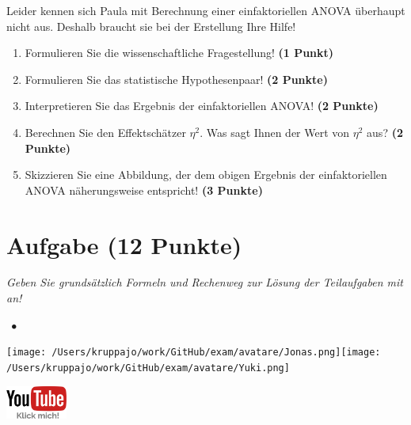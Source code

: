 \documentclass[a4paper, 9pt]{scrartcl}\usepackage[]{graphicx}\usepackage[]{xcolor}
\begin{document}
\vspace{1ex}

Leider kennen sich Paula mit Berechnung einer einfaktoriellen ANOVA überhaupt nicht aus. Deshalb braucht sie bei der Erstellung Ihre Hilfe! 

\begin{enumerate}
  \item Formulieren Sie die wissenschaftliche Fragestellung! \textbf{(1 Punkt)}
  \item Formulieren Sie das statistische Hypothesenpaar! \textbf{(2 Punkte)}
\item Interpretieren Sie das Ergebnis der einfaktoriellen ANOVA! \textbf{(2 Punkte)} 
\item Berechnen Sie den Effektschätzer $\eta^2$. Was sagt Ihnen der Wert von $\eta^2$ aus? \textbf{(2 Punkte)}
\item Skizzieren Sie eine Abbildung, der dem obigen Ergebnis der
  einfaktoriellen ANOVA näherungsweise entspricht! \textbf{(3 Punkte)}
\end{enumerate}

 
\clearpage

\section{Aufgabe \hfill (12 Punkte)}

\textit{Geben Sie grundsätzlich Formeln und Rechenweg zur Lösung der Teilaufgaben mit an!} \\[1Ex]
 

 
\ifcollection
\begin{flushright}
\tiny\vspace{-3Ex}
\textbf{\examinhaltstart}
\exammodulestatversuch $\;\bullet$
\exammodulebiostat
\vspace{-4Ex}
\end{flushright}
\begin{minipage}[t]{0.5\textwidth}
\texttt{[image: /Users/kruppajo/work/GitHub/exam/avatare/Jonas.png]}\hspace{-4mm}\texttt{[image: /Users/kruppajo/work/GitHub/exam/avatare/Yuki.png]}
\end{minipage}
\begin{minipage}[t]{0.5\textwidth}
\hfill
\href{https://youtu.be/G-AW_--5V0w}{\includegraphics[width = 2cm]{img/youtube}}
\end{minipage}
\fi
\end{document}
